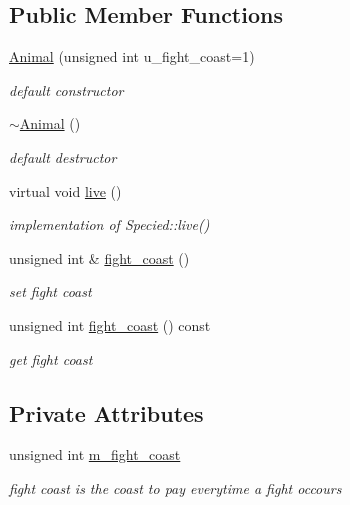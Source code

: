 \subsection*{Public Member Functions}
\begin{DoxyCompactItemize}
\item 
\hyperlink{classAnimal_a4afc6308ef1d106aaed2a5aa61851094}{Animal} (unsigned int u\_\-fight\_\-coast=1)
\begin{DoxyCompactList}\small\item\em default constructor \end{DoxyCompactList}\item 
\hyperlink{classAnimal_a476af25adde5f0dfa688129c8f86fa5c}{$\sim$Animal} ()
\begin{DoxyCompactList}\small\item\em default destructor \end{DoxyCompactList}\item 
virtual void \hyperlink{classAnimal_a4335ec7c755024705ec13084869006f9}{live} ()
\begin{DoxyCompactList}\small\item\em implementation of Specied::live() \end{DoxyCompactList}\item 
\hypertarget{classAnimal_ac18797411b022017013bfcf56e7f9414}{
unsigned int \& \hyperlink{classAnimal_ac18797411b022017013bfcf56e7f9414}{fight\_\-coast} ()}
\label{classAnimal_ac18797411b022017013bfcf56e7f9414}

\begin{DoxyCompactList}\small\item\em set fight coast \end{DoxyCompactList}\item 
\hypertarget{classAnimal_aca7896d9a29f9694dd6c2588fbcc0336}{
unsigned int \hyperlink{classAnimal_aca7896d9a29f9694dd6c2588fbcc0336}{fight\_\-coast} () const }
\label{classAnimal_aca7896d9a29f9694dd6c2588fbcc0336}

\begin{DoxyCompactList}\small\item\em get fight coast \end{DoxyCompactList}\end{DoxyCompactItemize}
\subsection*{Private Attributes}
\begin{DoxyCompactItemize}
\item 
unsigned int \hyperlink{classAnimal_a5f4e339fc2c5c487e9bec9e3bbb2d5ff}{m\_\-fight\_\-coast}
\begin{DoxyCompactList}\small\item\em fight coast is the coast to pay everytime a fight occours \end{DoxyCompactList}\end{DoxyCompactItemize}


